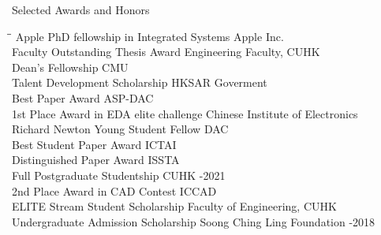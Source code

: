 
\begin{rSection}{Selected Awards and Honors}
\begin{tabbing}
\hspace{3.6in}\= \hspace{2.1in}\= \kill
Apple PhD fellowship in Integrated Systems \> Apple Inc.  \\
Faculty Outstanding Thesis Award \> Engineering Faculty, CUHK  \\
Dean's Fellowship \> CMU  \\
Talent Development Scholarship \> HKSAR Goverment  \\
Best Paper Award                       \> ASP-DAC                       \\
1st Place Award in EDA elite challenge\> Chinese Institute of Electronics  \\
Richard Newton Young Student Fellow    \> DAC  \\
Best Student Paper Award                       \> ICTAI                       \\
Distinguished Paper Award                      \>ISSTA                      \\
Full Postgraduate Studentship   \>CUHK  -2021\\
     2nd Place Award in CAD Contest               \> ICCAD                       \\
    ELITE Stream Student Scholarship                \> Faculty of Engineering, CUHK                             \\
    Undergraduate Admission Scholarship                             \> Soong Ching Ling Foundation  -2018 \\
\end{tabbing}
\end{rSection}

